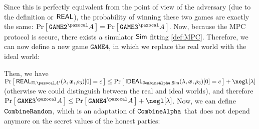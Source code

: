 \begin{proofE}
  \begin {pcimage}
    {\normalfont{}}
  \end{pcimage}
  Since this is perfectly equivalent from the point of view of the adversary (due to the definition or $\mathsf{REAL}$), the probability of winning these two games are exactly the same: $\pr{\texttt{GAME2}^\cA} = \pr{\texttt{GAME3}^\cA}$. Now, because the MPC protocol is secure, there exists a simulator $\mathsf{Sim}$ fitting \cref{def:MPC}. Therefore, we can now define a new game ${\texttt{GAME4}}$, in which we replace the real world with the ideal world:
  \begin {pcimage}
    {\normalfont{}}
  \end{pcimage}
  Then, we have $\pr{\Real_{\Uppi,\cA'}(\lambda,\vec{x},\rho_3)[0] = c} \leq  \pr{\Ideal_{\CombineAlpha,\Sim}(\lambda,\vec{x},\rho_3)[0] = c} + \negl[\lambda]$ (otherwise we could distinguish between the real and ideal worlds), and therefore $\pr{\texttt{GAME3}^\cA} \leq \pr{\texttt{GAME4}^\cA} + \negl[\lambda]$. Now, we can define ${\tt CombineRandom}$, which is an adaptation of ${\tt CombineAlpha}$ that does not depend anymore on the secret values of the honest parties:
  \begin {pcimage}\label{fct:combineRandom}
    {\normalfont{}}
\end{pcimage}
\end{proofE}
